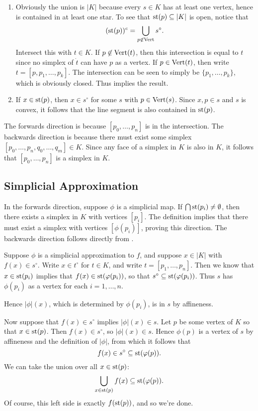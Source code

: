 \documentclass[../../solutions.tex]{subfiles}
\begin{document}
\begin{exercise} \leavevmode
\begin{enumerate}
\item
Obviously the union is $|K|$ because every $s\in K$ has at least one vertex, hence is contained in at least one star.
To see that $\operatorname{st}(p)\subseteq|K|$ is open, notice that
\[(\operatorname{st}(p))^c=\bigcup_{p\not\in\operatorname{Vert}}s^\circ.\]
Intersect this with $t\in K$.
If $p\not\in\operatorname{Vert}(t)$, then this intersection is equal to $t$ since no simplex of $\dot t$ can have $p$ as a vertex.
If $p\in\operatorname{Vert}(t)$, then write $t=[p,p_1,\dots,p_k]$.
The intersection can be seen to simply be $\{p_1,\dots,p_k\}$, which is obviously closed.
Thus  implies the result.

\item
If $x\in\operatorname{st}(p)$, then $x\in s^\circ$ for some $s$ with $p\in\operatorname{Vert}(s)$.
Since $x,p\in s$ and $s$ is convex, it follows that the line segment is also contained in $\operatorname{st}(p)$.
\end{enumerate}
\end{exercise}

\begin{exercise} \leavevmode
The forwards direction is because $[p_0,\dots,p_n]$ is in the intersection.
The backwards direction is because there must exist some simplex $[p_0,\dots,p_n,q_0,\dots,q_m]\in K$.
Since any face of a simplex in $K$ is also in $K$, it follows that $[p_0,\dots,p_n]$ is a simplex in $K$.
\end{exercise}

\subsection{Simplicial Approximation}
\begin{exercise} \leavevmode
In the forwards direction, suppose $\phi$ is a simplicial map.
If $\bigcap\operatorname{st}(p_i)\ne\emptyset$, then there exists a simplex in $K$ with vertices $[p_i]$.
The definition implies that there must exist a simplex with vertices $[\phi(p_i)]$, proving this direction.
The backwards direction follows directly from .
\end{exercise}

\begin{exercise} \leavevmode
Suppose $\phi$ is a simplicial approximation to $f$, and suppose $x\in|K|$ with $f(x)\in s^\circ$.
Write $x\in t^\circ$ for $t\in K$, and write $t=[p_1,\dots,p_n]$.
Then we know that $x\in\operatorname{st}(p_i)$ implies that $f(x)\in\operatorname{st}(\varphi(p_i))$, so that $s^\circ\subseteq\operatorname{st}(\varphi(p_i))$.
Thus $s$ has $\phi(p_i)$ as a vertex for each $i=1,\dots,n$.

Hence $|\phi|(x)$, which is determined by $\phi(p_i)$, is in $s$ by affineness.

Now suppose that $f(x)\in s^\circ$ implies $|\phi|(x)\in s$.
Let $p$ be some vertex of $K$ so that $x\in\operatorname{st}(p)$.
Then $f(x)\in s^\circ$, so $|\phi|(x)\in s$.
Hence $\phi(p)$ is a vertex of $s$ by affineness and the definition of $|\phi|$, from which it follows that
\[f(x)\in s^\circ\subseteq\operatorname{st}(\varphi(p)).\]
We can take the union over all $x\in\operatorname{st}(p)$:
\[\bigcup_{x\in\operatorname{st}(p)}f(x)\subseteq\operatorname{st}(\varphi(p)).\]
Of course, this left side is exactly $f(\operatorname{st}(p))$, and so we're done.
\end{exercise}
\end{document}
